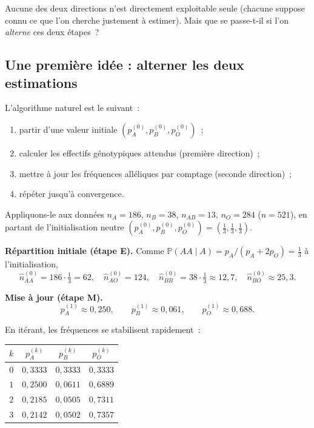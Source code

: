 Aucune des deux directions n'est directement exploitable seule (chacune suppose
connu ce que l'on cherche justement à estimer). Mais que se passe-t-il si l'on
\textit{alterne} ces deux étapes~?

\subsection{Une première idée : alterner les deux estimations}

L'algorithme naturel est le suivant~:
\begin{enumerate}
  \item partir d'une valeur initiale $(p_A^{(0)}, p_B^{(0)}, p_O^{(0)})$~;
  \item calculer les effectifs génotypiques attendus (première direction)~;
  \item mettre à jour les fréquences alléliques par comptage (seconde direction)~;
  \item répéter jusqu'à convergence.
\end{enumerate}

Appliquons-le aux données $n_A = 186$, $n_B = 38$, $n_{AB} = 13$, $n_O = 284$
($n = 521$), en partant de l'initialisation neutre
$(p_A^{(0)}, p_B^{(0)}, p_O^{(0)}) = (\tfrac{1}{3}, \tfrac{1}{3}, \tfrac{1}{3})$.

\textbf{Répartition initiale (étape E).} Comme
$\mathbb{P}(AA \mid A) = p_A/(p_A + 2 p_O) = \tfrac{1}{3}$ à l'initialisation,
$$
\hat{n}_{AA}^{(0)} = 186 \cdot \tfrac{1}{3} = 62, \quad
\hat{n}_{AO}^{(0)} = 124, \quad
\hat{n}_{BB}^{(0)} = 38 \cdot \tfrac{1}{3} \approx 12{,}7, \quad
\hat{n}_{BO}^{(0)} \approx 25{,}3 .
$$

\textbf{Mise à jour (étape M).}
$$
p_A^{(1)} \approx 0{,}250, \qquad
p_B^{(1)} \approx 0{,}061, \qquad
p_O^{(1)} \approx 0{,}688 .
$$

En itérant, les fréquences se stabilisent rapidement~:

\begin{center}
\begin{tabular}{cccc}
\hline
$k$ & $p_A^{(k)}$ & $p_B^{(k)}$ & $p_O^{(k)}$ \\
\hline
$0$ & $0{,}3333$ & $0{,}3333$ & $0{,}3333$ \\
$1$ & $0{,}2500$ & $0{,}0611$ & $0{,}6889$ \\
$2$ & $0{,}2185$ & $0{,}0505$ & $0{,}7311$ \\
$3$ & $0{,}2142$ & $0{,}0502$ & $0{,}7357$ \\
\hline
\end{tabular}
\end{center}


